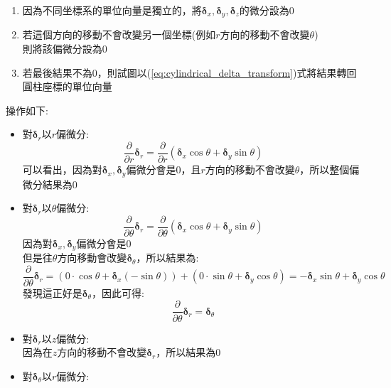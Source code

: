 \documentclass[../main.tex]{subfiles}
\begin{document}
\begin{itemize}
\begin{itemize}
\begin{enumerate}
        \item 因為不同坐標系的單位向量是獨立的，將$\bm\delta_x,\bm\delta_y,\bm\delta_z$的微分設為0
        \item 若這個方向的移動不會改變另一個坐標(例如$r$方向的移動不會改變$\theta$)\\
        則將該偏微分設為0
        \item 若最後結果不為0，則試圖以(\ref{eq:cylindrical_delta_transform})式將結果轉回圓柱座標的單位向量
      \end{enumerate}
      操作如下:
      \begin{itemize}
        \item 對$\bm\delta_r$以$r$偏微分:
          \begin{equation}
            \frac{\partial}{\partial r} \bm\delta_r = \frac{\partial}{\partial r} \left(\bm\delta_x \cos\theta + \bm\delta_y \sin\theta\right) 
          \end{equation}
          可以看出，因為對$\bm\delta_x,\bm\delta_y$偏微分會是0，且$r$方向的移動不會改變$\theta$，所以整個偏微分結果為0
        \item 對$\bm\delta_r$以$\theta$偏微分:
          \begin{equation}
            \frac{\partial}{\partial \theta} \bm\delta_r = \frac{\partial}{\partial \theta} \left(\bm\delta_x \cos\theta + \bm\delta_y \sin\theta\right) 
          \end{equation}
          因為對$\bm\delta_x,\bm\delta_y$偏微分會是0\\
          但是往$\theta$方向移動會改變$\bm\delta_\theta$，所以結果為:
          \begin{equation}
            \frac{\partial}{\partial \theta} \bm\delta_r = \left(
              0\cdot \cos\theta + \bm\delta_x (-\sin\theta)
            \right)+ \left(
              0\cdot \sin\theta + \bm\delta_y \cos\theta
            \right) = -\bm\delta_x \sin\theta + \bm\delta_y \cos\theta 
          \end{equation}
          發現這正好是$\bm\delta_\theta$，因此可得:
          \begin{equation}
            \boxed{
            \frac{\partial}{\partial \theta} \bm\delta_r = \bm\delta_\theta
            }
          \end{equation}
        \item 對$\bm\delta_r$以$z$偏微分:\\
          因為在$z$方向的移動不會改變$\bm\delta_r$，所以結果為0
        \item 對$\bm\delta_\theta$以$r$偏微分:\\

\end{itemize}
\end{itemize}
\end{itemize}
\end{document}
